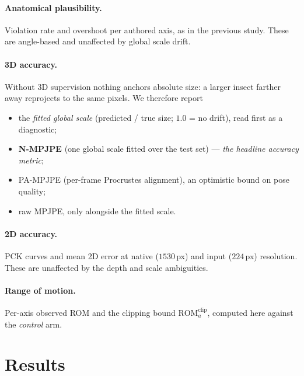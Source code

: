 \documentclass[11pt,a4paper]{article}
\begin{document}
\paragraph{Anatomical plausibility.} Violation rate and overshoot per authored
axis, as in the previous study. These are angle-based and unaffected by global
scale drift.

\paragraph{3D accuracy.} Without 3D supervision nothing anchors absolute size:
a larger insect farther away reprojects to the same pixels. We therefore report
\begin{itemize}[nosep,leftmargin=1.6em]
  \item the \emph{fitted global scale} (predicted / true size; $1.0$ = no drift),
        read first as a diagnostic;
  \item \textbf{N-MPJPE} (one global scale fitted over the test set) ---
        \emph{the headline accuracy metric};
  \item PA-MPJPE (per-frame Procrustes alignment), an optimistic bound on pose
        quality;
  \item raw MPJPE, only alongside the fitted scale.
\end{itemize}

\paragraph{2D accuracy.} PCK curves and mean 2D error at native ($1530$\,px) and
input ($224$\,px) resolution. These are unaffected by the depth and scale
ambiguities.

\paragraph{Range of motion.} Per-axis observed ROM and the clipping bound
$\mathrm{ROM}^{\text{clip}}_a$, computed here against the \emph{control} arm.

\section{Results}
\label{sec:results}
\end{document}
